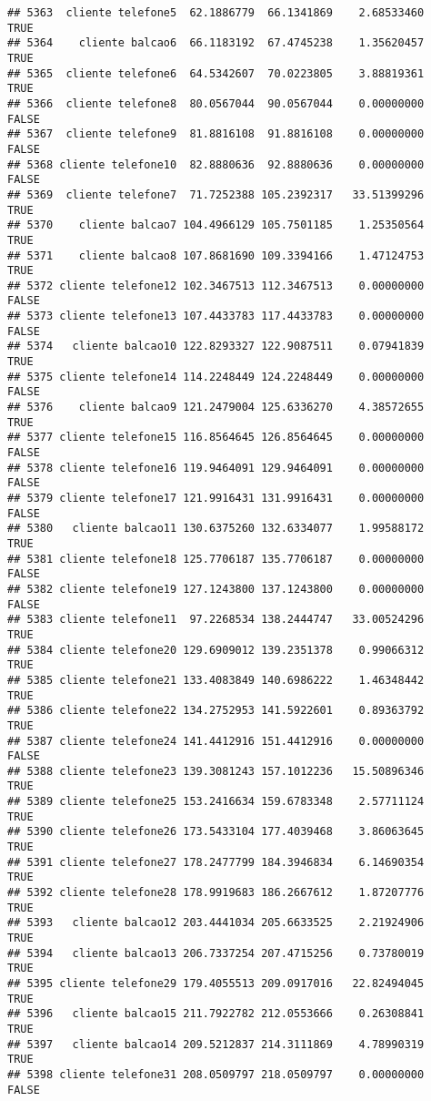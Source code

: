 \documentclass[
]{article}
\begin{document}
\begin{verbatim}
## 5363  cliente telefone5  62.1886779  66.1341869    2.68533460     TRUE
## 5364    cliente balcao6  66.1183192  67.4745238    1.35620457     TRUE
## 5365  cliente telefone6  64.5342607  70.0223805    3.88819361     TRUE
## 5366  cliente telefone8  80.0567044  90.0567044    0.00000000    FALSE
## 5367  cliente telefone9  81.8816108  91.8816108    0.00000000    FALSE
## 5368 cliente telefone10  82.8880636  92.8880636    0.00000000    FALSE
## 5369  cliente telefone7  71.7252388 105.2392317   33.51399296     TRUE
## 5370    cliente balcao7 104.4966129 105.7501185    1.25350564     TRUE
## 5371    cliente balcao8 107.8681690 109.3394166    1.47124753     TRUE
## 5372 cliente telefone12 102.3467513 112.3467513    0.00000000    FALSE
## 5373 cliente telefone13 107.4433783 117.4433783    0.00000000    FALSE
## 5374   cliente balcao10 122.8293327 122.9087511    0.07941839     TRUE
## 5375 cliente telefone14 114.2248449 124.2248449    0.00000000    FALSE
## 5376    cliente balcao9 121.2479004 125.6336270    4.38572655     TRUE
## 5377 cliente telefone15 116.8564645 126.8564645    0.00000000    FALSE
## 5378 cliente telefone16 119.9464091 129.9464091    0.00000000    FALSE
## 5379 cliente telefone17 121.9916431 131.9916431    0.00000000    FALSE
## 5380   cliente balcao11 130.6375260 132.6334077    1.99588172     TRUE
## 5381 cliente telefone18 125.7706187 135.7706187    0.00000000    FALSE
## 5382 cliente telefone19 127.1243800 137.1243800    0.00000000    FALSE
## 5383 cliente telefone11  97.2268534 138.2444747   33.00524296     TRUE
## 5384 cliente telefone20 129.6909012 139.2351378    0.99066312     TRUE
## 5385 cliente telefone21 133.4083849 140.6986222    1.46348442     TRUE
## 5386 cliente telefone22 134.2752953 141.5922601    0.89363792     TRUE
## 5387 cliente telefone24 141.4412916 151.4412916    0.00000000    FALSE
## 5388 cliente telefone23 139.3081243 157.1012236   15.50896346     TRUE
## 5389 cliente telefone25 153.2416634 159.6783348    2.57711124     TRUE
## 5390 cliente telefone26 173.5433104 177.4039468    3.86063645     TRUE
## 5391 cliente telefone27 178.2477799 184.3946834    6.14690354     TRUE
## 5392 cliente telefone28 178.9919683 186.2667612    1.87207776     TRUE
## 5393   cliente balcao12 203.4441034 205.6633525    2.21924906     TRUE
## 5394   cliente balcao13 206.7337254 207.4715256    0.73780019     TRUE
## 5395 cliente telefone29 179.4055513 209.0917016   22.82494045     TRUE
## 5396   cliente balcao15 211.7922782 212.0553666    0.26308841     TRUE
## 5397   cliente balcao14 209.5212837 214.3111869    4.78990319     TRUE
## 5398 cliente telefone31 208.0509797 218.0509797    0.00000000    FALSE

\end{verbatim}
\end{document}
